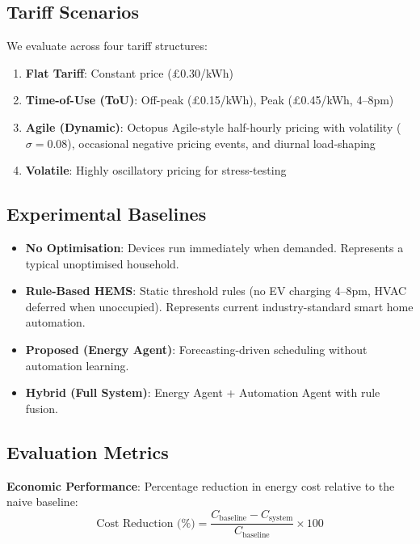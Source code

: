 \documentclass[11pt,a4paper]{article}
\begin{document}
\subsection{Tariff Scenarios}

We evaluate across four tariff structures:
\begin{enumerate}
    \item \textbf{Flat Tariff}: Constant price (£0.30/kWh)
    \item \textbf{Time-of-Use (ToU)}: Off-peak (£0.15/kWh), Peak (£0.45/kWh, 4--8pm)
    \item \textbf{Agile (Dynamic)}: Octopus Agile-style half-hourly pricing with volatility ($\sigma = 0.08$), occasional negative pricing events, and diurnal load-shaping
    \item \textbf{Volatile}: Highly oscillatory pricing for stress-testing
\end{enumerate}

\subsection{Experimental Baselines}

\begin{itemize}
    \item \textbf{No Optimisation}: Devices run immediately when demanded. Represents a typical unoptimised household.
    \item \textbf{Rule-Based HEMS}: Static threshold rules (no EV charging 4--8pm, HVAC deferred when unoccupied). Represents current industry-standard smart home automation.
    \item \textbf{Proposed (Energy Agent)}: Forecasting-driven scheduling without automation learning.
    \item \textbf{Hybrid (Full System)}: Energy Agent + Automation Agent with rule fusion.
\end{itemize}

\subsection{Evaluation Metrics}

\textbf{Economic Performance}: Percentage reduction in energy cost relative to the naive baseline:
\begin{equation}
\text{Cost Reduction (\%)} = \frac{C_{\text{baseline}} - C_{\text{system}}}{C_{\text{baseline}}} \times 100
\end{equation}
\end{document}
